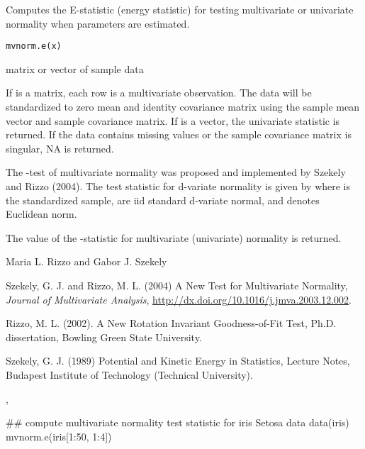 \begin{Description}\relax
Computes the E-statistic (energy statistic) for testing multivariate 
or univariate normality when parameters are estimated.
\end{Description}
\begin{Usage}
\begin{verbatim}
mvnorm.e(x)
\end{verbatim}
\end{Usage}
\begin{Arguments}
\begin{ldescription}
\item[\code{x}] matrix or vector of sample data
\end{ldescription}
\end{Arguments}
\begin{Details}\relax
If  is a matrix, each row is a multivariate observation. The
data will be standardized to zero mean and identity covariance matrix
using the sample mean vector and sample covariance matrix. If 
is a vector, the univariate statistic  is returned. 
If the data contains missing values or the sample covariance matrix is 
singular, NA is returned.

The -test of multivariate normality was proposed
and implemented by Szekely and Rizzo (2004). The test statistic for 
d-variate normality is given by
where  is the standardized sample, 
 are iid standard d-variate normal, and
\eqn{\| \cdot \|}{|| ||} denotes Euclidean norm.\end{Details}
\begin{Value}
The value of the -statistic for multivariate
(univariate) normality is returned.\end{Value}
\begin{Author}\relax
Maria L. Rizzo  and
Gabor J. Szekely 
\end{Author}
\begin{References}\relax
Szekely, G. J. and Rizzo, M. L. (2004) A New Test for 
Multivariate Normality, \emph{Journal of Multivariate Analysis},
\url{http://dx.doi.org/10.1016/j.jmva.2003.12.002}.

Rizzo, M. L. (2002). A New Rotation Invariant Goodness-of-Fit Test,
Ph.D. dissertation, Bowling Green State University.

Szekely, G. J. (1989) Potential and Kinetic Energy in Statistics, 
Lecture Notes, Budapest Institute of Technology (Technical University).\end{References}
\begin{SeeAlso}\relax
{}, 
\end{SeeAlso}
\begin{Examples}
\begin{ExampleCode}
 
 ## compute multivariate normality test statistic for iris Setosa data
 data(iris)
 mvnorm.e(iris[1:50, 1:4])
 \end{ExampleCode}
\end{Examples}

